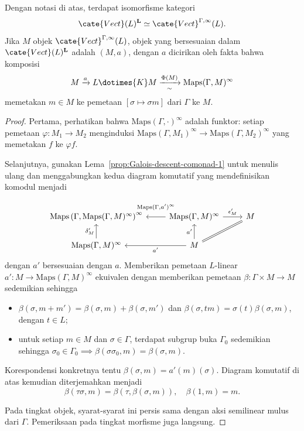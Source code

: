\begin{lemma}\label{prop:Galois-descent-aux}
	Dengan notasi di atas, terdapat isomorfisme kategori
	\[ \cate{Vect}(L)^{\mathbf{L}} \simeq \cate{Vect}^{\Gamma, \infty}(L). \]
	Jika $M$ objek $\cate{Vect}^{\Gamma,\infty}(L)$, objek yang bersesuaian
	dalam $\cate{Vect}(L)^{\mathbf{L}}$ adalah $(M,a)$, dengan $a$ dicirikan
	oleh fakta bahwa komposisi
	\[ M \xrightarrow{a} L \dotimes{K} M \xrightarrow[\sim]{\Phi(M)} \mathrm{Maps}(\Gamma, M)^\infty \]
	memetakan $m\in M$ ke pemetaan $[\sigma\mapsto\sigma m]$ dari $\Gamma$ ke
	$M$.
\end{lemma}
\begin{proof}
	Pertama, perhatikan bahwa $\mathrm{Maps}(\Gamma,\mathord\cdot)^\infty$
	adalah funktor: setiap pemetaan $\varphi:M_1\to M_2$ menginduksi
	$\mathrm{Maps}(\Gamma,M_1)^\infty\to
	\mathrm{Maps}(\Gamma,M_2)^\infty$ yang memetakan $f$ ke $\varphi f$.

	Selanjutnya, gunakan Lema~\ref{prop:Galois-descent-comonad-1} untuk
	menulis ulang dan menggabungkan kedua diagram komutatif yang mendefinisikan
	komodul menjadi
	\[\begin{tikzcd}
		\mathrm{Maps}\left( \Gamma, \mathrm{Maps}(\Gamma, M)^\infty \right)^\infty & \mathrm{Maps}(\Gamma, M)^\infty \arrow[l, "{\mathrm{Maps}(\Gamma, a')^\infty }"' inner sep=0.8em] \arrow[r, "{\epsilon'_M}"] & M \\
		\mathrm{Maps}(\Gamma, M)^\infty \arrow[u, "{\delta'_M}"] & M \arrow[l, "{a'}"] \arrow[u, "{a'}"] \arrow[equal, ru] &
	\end{tikzcd}\]
	dengan $a'$ bersesuaian dengan $a$. Memberikan pemetaan $L$-linear
	$a':M\to\mathrm{Maps}(\Gamma,M)^\infty$ ekuivalen dengan memberikan
	pemetaan $\beta:\Gamma\times M\to M$ sedemikian sehingga
	\begin{itemize}
		\item $\beta(\sigma,m+m')=\beta(\sigma,m)+\beta(\sigma,m')$ dan
		$\beta(\sigma,tm)=\sigma(t)\beta(\sigma,m)$, dengan $t\in L$;
		\item untuk setiap $m\in M$ dan $\sigma\in\Gamma$, terdapat subgrup
		buka $\Gamma_0$ sedemikian sehingga
		$\sigma_0\in\Gamma_0\implies
		\beta(\sigma\sigma_0,m)=\beta(\sigma,m)$.
	\end{itemize}
	Korespondensi konkretnya tentu $\beta(\sigma,m)=a'(m)(\sigma)$. Diagram
	komutatif di atas kemudian diterjemahkan menjadi
	\[ \beta(\tau\sigma, m) = \beta(\tau, \beta(\sigma, m)), \quad \beta(1, m) = m. \]

	Pada tingkat objek, syarat-syarat ini persis sama dengan aksi semilinear
	mulus dari $\Gamma$. Pemeriksaan pada tingkat morfisme juga langsung.
\end{proof}

